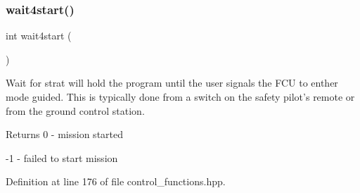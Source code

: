 \mbox{\label{group__control__functions_gab6fe46f505ab9804b4ed98b96286a811}} 
\subsubsection{\texorpdfstring{wait4start()}{wait4start()}}
{\footnotesize\ttfamily int wait4start (\begin{DoxyParamCaption}{ }\end{DoxyParamCaption})}

Wait for strat will hold the program until the user signals the F\+CU to enther mode guided. This is typically done from a switch on the safety pilot’s remote or from the ground control station. \begin{DoxyReturn}{Returns}
0 -\/ mission started 

-\/1 -\/ failed to start mission 
\end{DoxyReturn}


Definition at line 176 of file control\+\_\+functions.\+hpp.

